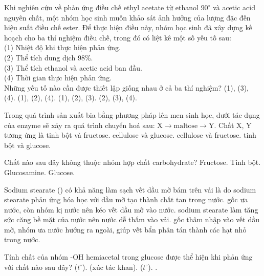 \documentclass[11pt,a4paper]{article}
\begin{document}
\begin{ex}
Khi nghiên cứu về phản ứng điều chế ethyl acetate từ ethanol $90^\circ$ và acetic acid nguyên chất, một nhóm học sinh muốn khảo sát ảnh hưởng của lượng  đặc đến hiệu suất điều chế ester. Để thực hiện điều này, nhóm học sinh đã xây dựng kế hoạch cho ba thí nghiệm điều chế, trong đó có liệt kê một số yếu tố sau:\\
(1) Nhiệt độ khi thực hiện phản ứng.\\
(2) Thể tích dung dịch  98\%.\\
(3) Thể tích ethanol và acetic acid ban đầu.\\
(4) Thời gian thực hiện phản ứng.\\
Những yếu tố nào cần được thiết lập giống nhau ở cả ba thí nghiệm?
\choice
{\True (1), (3), (4).}
{(1), (2), (4).}
{(1), (2), (3).}
{(2), (3), (4).}

\end{ex}

\begin{ex}
Trong quá trình sản xuất bia bằng phương pháp lên men sinh học, dưới tác dụng của enzyme sẽ xảy ra quá trình chuyển hoá sau: $\text{X} \longrightarrow \text{maltose} \longrightarrow \text{Y}$. Chất X, Y tương ứng là
\choice
{tinh bột và fructose.}
{cellulose và glucose.}
{cellulose và fructose.}
{\True tinh bột và glucose.}

\end{ex}

\begin{ex}
Chất nào sau đây không thuộc nhóm hợp chất carbohydrate?
\choice
{Fructose.}
{Tinh bột.}
{\True Glucosamine.}
{Glucose.}

\end{ex}

\begin{ex}
Sodium stearate () có khả năng làm sạch vết dầu mỡ bám trên vải là do
\choice
{sodium stearate phản ứng hóa học với dầu mỡ tạo thành chất tan trong nước.}
{gốc  ưa nước, còn nhóm  kị nước nên kéo vết dầu mỡ vào nước.}
{sodium stearate làm tăng sức căng bề mặt của nước nên nước dễ thấm vào vải.}
{\True gốc  thâm nhập vào vết dầu mỡ, nhóm  ưa nước hướng ra ngoài, giúp vết bẩn phân tán thành các hạt nhỏ trong nước.}

\end{ex}

\begin{ex}
Tính chất của nhóm -OH hemiacetal trong glucose được thể hiện khi phản ứng với chất nào sau đây?
\choice
{ ($t^\circ$).}
{\True {} (xúc tác  khan).}
{ ($t^\circ$).}
{.}

\end{ex}
\end{document}
